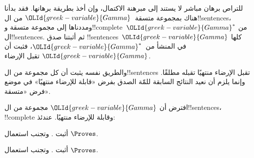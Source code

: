 \documentclass[../../../include/open-logic-section]{subfiles}
\begin{document}
      {}
      {}


للتراص برهان مباشر لا يستند إلى مبرهنة الاكتمال، وإن أخذ بطريقة
برهانها. فقد بدأنا هناك بمجموعة متسقة~${\OLId{greek-variable}{Gamma}}$ من ال!!{sentence}s،
ومددناها إلى مجموعة متسقة
و!!{complete}~${\OLId{greek-variable}{Gamma}}^*$ من ال!!{sentence}s. ثم أثبتنا صدق
!!{sentence}s~${\OLId{greek-variable}{Gamma}}$ كلها في
المنشأ من~${\OLId{greek-variable}{Gamma}}^*$، فثبت أن ${\OLId{greek-variable}{Gamma}}$ تقبل الإرضاء.

والطريق نفسه يثبت أن كل مجموعة من ال!!{sentence}s تقبل الإرضاء
منتهيًا تقبله مطلقًا. وإنما يلزم أن نعيد النتائج السابقة للمّة الصدق
بفرض «قابلة للإرضاء منتهيًا» في موضع فرض «متسقة».

\begin{prop}
افترض أن ${\OLId{greek-variable}{Gamma}}$ مجموعة من ال!!{sentence}s، !!{complete} وقابلة للإرضاء
منتهيًا. عندئذ:
\begin{enumerate}


\end{enumerate}
\end{prop}

\begin{prob}
أثبت . وتجنب استعمال $\Proves$.
\end{prob}
\tagendprob

\begin{prob}
أثبت . وتجنب استعمال $\Proves$.
\end{prob}
\tagendprob

\end{document}
